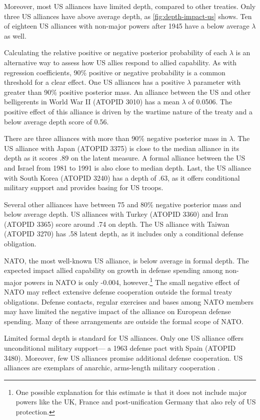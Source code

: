 \documentclass[12pt]{article}
\begin{document}
Moreover, most US alliances have limited depth, compared to other treaties. 
Only three US alliances have above average depth, as \autoref{fig:depth-impact-us} shows. 
Ten of eighteen US alliances with non-major powers after 1945 have a below average $\lambda$ as well. 


Calculating the relative positive or negative posterior probability of each $\lambda$ is an alternative way to assess how US allies respond to allied capability. 
As with regression coefficients, 90\% positive or negative probability is a common threshold for a clear effect. 
One US alliances has a positive $\lambda$ parameter with greater than 90\% positive posterior mass. 
An alliance between the US and other belligerents in World War II (ATOPID 3010) has a mean $\lambda$ of 0.0506. 
The positive effect of this alliance is driven by the wartime nature of the treaty and a below average depth score of 0.56.  


There are three alliances with more than 90\% negative posterior mass in $\lambda$. 
The US alliance with Japan (ATOPID 3375) is close to the median alliance in its depth as it scores .89 on the latent measure. 
A formal alliance between the US and Israel from 1981 to 1991 is also close to median depth. 
Last, the US alliance with South Korea (ATOPID 3240) has a depth of .63, as it offers conditional military support and provides basing for US troops. 


Several other alliances have between 75 and 80\% negative posterior mass and below average depth. 
US alliances with Turkey (ATOPID 3360) and Iran (ATOPID 3365)  score around .74 on depth. 
The US alliance with Taiwan (ATOPID 3270) has .58 latent depth, as it includes only a conditional defense obligation.  


NATO, the most well-known US alliance, is below average in formal depth. 
The expected impact allied capability on growth in defense spending among non-major powers in NATO is only -0.004, however.\footnote{One possible explanation for this estimate is that it does not include major powers like the UK, France and post-unification Germany that also rely of US protection.}
The small negative effect of NATO may reflect extensive defense cooperation outside the formal treaty obligations. 
Defense contacts, regular exercises and bases among NATO members may have limited the negative impact of the alliance on European defense spending. 
Many of these arrangements are outside the formal scope of NATO. 


Limited formal depth is standard for US alliances. 
Only one US alliance offers unconditional military support--- a 1963 defense pact with Spain (ATOPID 3480). 
Moreover, few US alliances promise additional defense cooperation. 
US alliances are exemplars of anarchic, arms-length military cooperation \citep{Lake1996}. 
\end{document}
